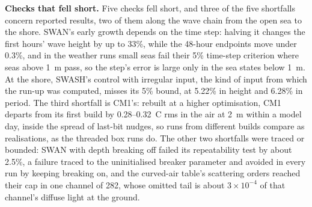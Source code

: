 \textbf{Checks that fell short.} Five checks fell short, and three of the five shortfalls concern reported
results, two of them along the wave chain from the open sea to the shore. SWAN's early growth depends on the time
step: halving it changes the first hours' wave height by up to 33\%, while the 48-hour endpoints move under 0.3\%,
and in the weather runs small seas fail their 5\% time-step criterion where seas above 1~m pass, so the step's error is large only in the sea states below 1~m. At the shore, SWASH's control with irregular input, the kind of input from
which the run-up was computed, misses its 5\% bound, at 5.22\% in height and 6.28\% in period. The
third shortfall is CM1's: rebuilt at a higher optimisation, CM1 departs from its first build by
0.28--0.32~\textdegree C rms in the air at 2~m within a model day, inside the spread of last-bit nudges, so runs
from different builds compare as realisations, as the threaded box runs do.
The other two shortfalls were traced or bounded: SWAN with depth breaking off failed its repeatability test by
about 2.5\%, a failure traced to the uninitialised breaker parameter and avoided in every run by keeping breaking
on, and the curved-air table's scattering orders reached their cap in one channel of 282, whose omitted tail is
about $3\times10^{-4}$ of that channel's diffuse light at the ground.
